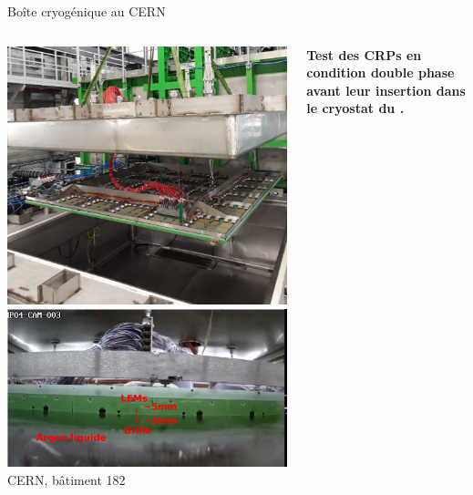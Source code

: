 {
	\setlength\pdfpagewidth{12.8cm}%
	\setlength\pdfpageheight{9cm}%
	\begin{frame}[plain]
	\end{frame}
}

    \begin{frame}{Boîte cryogénique au CERN}
   		\begin{columns}
   			\begin{column}{0.4\textwidth}
   				\includegraphics[width=\textwidth]{./pictures/crp_inserting_coldbox.png}\\
   				\includegraphics[width=\textwidth]{./pictures/in_coldbox.png}\\
   				CERN, bâtiment 182
    		\end{column}
    		\begin{column}{0.6\textwidth}
    			\begin{scriptsize}
	    			\textbf{Test des CRPs en condition double phase avant leur insertion dans le cryostat du \SSS{}.}\\
	    			

\end{scriptsize}
\end{column}
\end{columns}
\end{frame}
